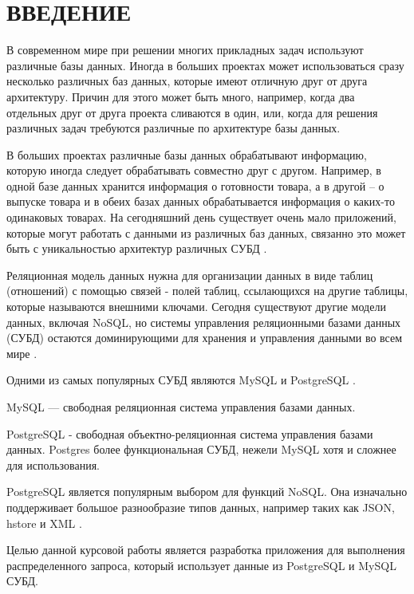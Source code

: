 \chapter*{ВВЕДЕНИЕ}


В современном мире при решении многих прикладных задач используют различные базы данных. Иногда в больших проектах может использоваться сразу несколько различных баз данных, которые имеют отличную друг от друга архитектуру. Причин для этого может быть много, например, когда два отдельных друг от друга проекта сливаются в один, или, когда для решения различных задач требуются различные по архитектуре базы данных.

В больших проектах различные базы данных обрабатывают информацию, которую иногда следует обрабатывать совместно друг с другом. Например, в одной базе данных хранится информация о готовности товара, а в другой -- о выпуске товара и в обеих базах данных обрабатывается информация о каких-то одинаковых товарах. На сегодняшний день существует очень мало приложений, которые могут работать с данными из различных баз данных, связанно это может быть с уникальностью архитектур различных СУБД \cite{vvedenie}. 

Реляционная модель данных нужна для организации данных в виде таблиц (отношений) с помощью связей - полей таблиц, 
ссылающихся на другие таблицы, которые называются внешними ключами.  
Сегодня существуют другие модели данных, включая NoSQL, но системы управления реляционными базами данных (СУБД) остаются доминирующими для хранения 
и управления данными во всем мире \cite{db-engines-rating}.

Одними из самых популярных СУБД являются MySQL и PostgreSQL \cite{popular}. 

MySQL --- свободная реляционная система управления базами данных. 

PostgreSQL - свободная объектно-реляционная система управления базами данных.
Postgres более функциональная СУБД, нежели MySQL хотя и сложнее для использования.

PostgreSQL является популярным выбором для функций NoSQL. Она изначально    поддерживает   большое   разнообразие типов данных, например таких как JSON, hstore и XML \cite{postgres-types}.

Целью данной курсовой работы является разработка приложения для выполнения распределенного запроса, который использует данные из \newline PostgreSQL и MySQL СУБД.


